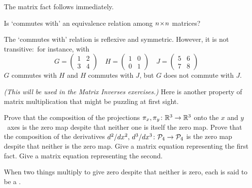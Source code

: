 \begin{exercises}
\begin{answer}
\begin{exparts}
          The matrix fact follows immediately.  
     \end{exparts}
    \end{answer}
  \item 
    Is `commutes with' an equivalence relation among $n \! \times \! n$
    matrices?
    \begin{answer}
      The `commutes with' relation is reflexive and symmetric.
      However, it is not transitive:~for instance, with
      \begin{equation*}
        G=\begin{pmatrix}
          1  &2  \\
          3  &4
        \end{pmatrix}
        \quad
        H=\begin{pmatrix}
          1  &0  \\
          0  &1
        \end{pmatrix}
        \quad
        J=\begin{pmatrix}
          5  &6  \\
          7  &8
        \end{pmatrix}
      \end{equation*}
      $G$ commutes with $H$ and $H$ commutes with $J$, but $G$ does not
      commute with $J$.    
    \end{answer}
  \recommended \item \label{exer:ZeroDivisor}
    \textit{(This will be used in the Matrix Inverses exercises.)}
    Here is another property of matrix multiplication that might be
    puzzling at first sight.
    \begin{exparts}
      \partsitem Prove that the composition of the projections
        \( \mbox{$\pi_x,\pi_y\colon \mathbb{R}^3\to \mathbb{R}^3$} \)
        onto the \( x \) and \( y \)~axes
        is the zero map despite that neither one is itself the zero map.
      \partsitem Prove that the composition of the derivatives
        \( \mbox{$d^2/dx^2,\,d^3/dx^3\colon \mathcal{P}_4\to \mathcal{P}_4$} \)
        is the zero map despite that neither is the zero map.
      \partsitem Give a matrix equation representing the first fact.
      \partsitem Give a matrix equation representing the second.
    \end{exparts}
    When two things multiply to give zero despite that neither is zero, each is
    said to be a .%
    \begin{answer}
      \begin{exparts}

\end{exparts}
\end{answer}
\end{exercises}
